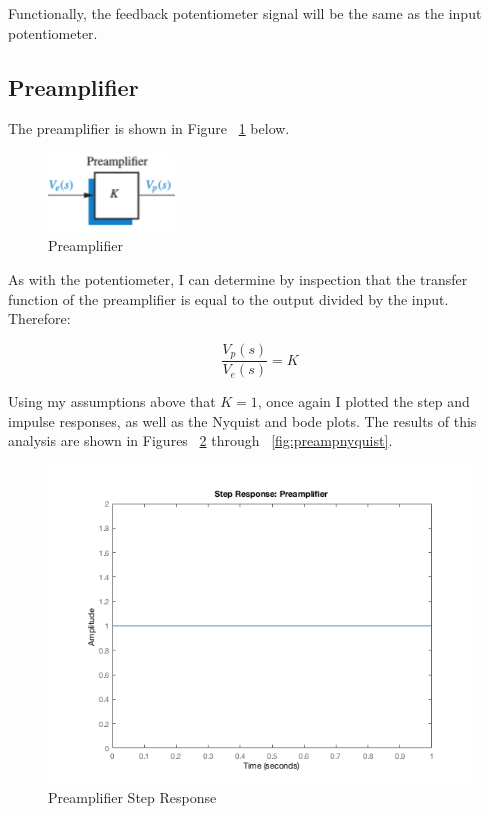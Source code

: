 \documentclass[12pt]{article}
\begin{document}
Functionally, the feedback potentiometer signal will be the same as the input potentiometer.

\subsection{Preamplifier}

The preamplifier is shown in Figure ~\ref{fig:preamp} below.

\begin{figure}[H]
\begin{center}
	\includegraphics[width=0.3\textwidth]{./img/PreamplifierBlock.png}
	\caption{\label{fig:preamp}Preamplifier}
\end{center}
\end{figure}

As with the potentiometer, I can determine by inspection that the transfer function of the preamplifier is equal to the output divided by the input. Therefore:

\begin{equation}
\frac{V_{p}(s)}{V_{e}(s)} = K\label{eq:2}
\end{equation}

Using my assumptions above that $K = 1$, once again I plotted the step and impulse responses, as well as the Nyquist and bode plots. The results of this analysis are shown in Figures ~\ref{fig:preampstep} through ~\ref{fig:preampnyquist}.

\begin{figure}[H]
\begin{center}
	\includegraphics[width=\textwidth]{./img/PreampStep.png}
	\caption{\label{fig:preampstep}Preamplifier Step Response}
\end{center}
\end{figure}
\end{document}
